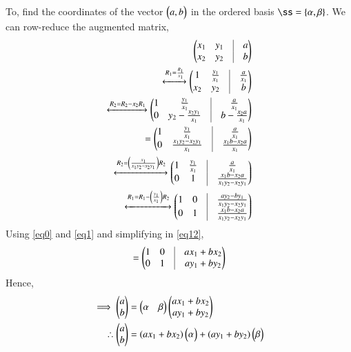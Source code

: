 \documentclass[journal,12pt,twocolumn]{IEEEtran}
\begin{document}
To, find the coordinates of the vector $\begin{pmatrix}a,b\end{pmatrix}$ in the ordered basis $\ss=\{\vec{\alpha},\vec{\beta}\}$. We
can row-reduce the augmented matrix,
   \begin{align}
      \myvec{x_1&y_1&\vrule&a\\x_2&y_2&\vrule&b}\\
        \xleftrightarrow{R_1=\frac{R_1}{x_1}}\myvec{1&\frac{y_1}{x_1}&\vrule&\frac{a}{x_1}\\x_2&y_2&\vrule&b}\\
     \xleftrightarrow{R_2=R_2-x_2R_1}\myvec{1&\frac{y_1}{x_1}&\vrule&\frac{a}{x_1}\\0&y_2-\frac{x_2y_1}{x_1}&\vrule&b-\frac{x_2a}{x_1}}\\
     =\myvec{1&\frac{y_1}{x_1}&\vrule&\frac{a}{x_1}\\0&\frac{x_1y_2-x_2y_1}{x_1}&\vrule&\frac{x_1b-x_2a}{x_1}}\\
      \xleftrightarrow{R_2=\left(\frac{x_1}{x_1y_2-x_2y_1}\right)R_2}\myvec{1&\frac{y_1}{x_1}&\vrule&\frac{a}{x_1}\\0&1&\vrule&\frac{x_1b-x_2a}{x_1y_2-x_2y_1}}\\
      \xleftrightarrow{R_1=R_1-\left(\frac{y_1}{x_1}\right)R_2}\myvec{1&0&\vrule&\frac{ay_2-by_1}{x_1y_2-x_2y_1}\\0&1&\vrule&\frac{x_1b-x_2a}{x_1y_2-x_2y_1}}\label{eq12}
\end{align}
Using \ref{eq0} and \ref{eq1} and simplifying in \ref{eq12},
\begin{align}
=\myvec{1&0&\vrule&ax_1+bx_2\\0&1&\vrule&ay_1+by_2}
\end{align}
Hence,
\begin{align}
\implies \begin{pmatrix}a\\b\end{pmatrix}&=\begin{pmatrix}\alpha & \beta\end{pmatrix}\begin{pmatrix}ax_1+bx_2\\ay_1+by_2\end{pmatrix}\\
\therefore \begin{pmatrix}a\\b\end{pmatrix}&=(ax_1+bx_2)\begin{pmatrix}\alpha\end{pmatrix}+(ay_1+by_2)\begin{pmatrix}\beta\end{pmatrix}
\end{align}
\end{document}
